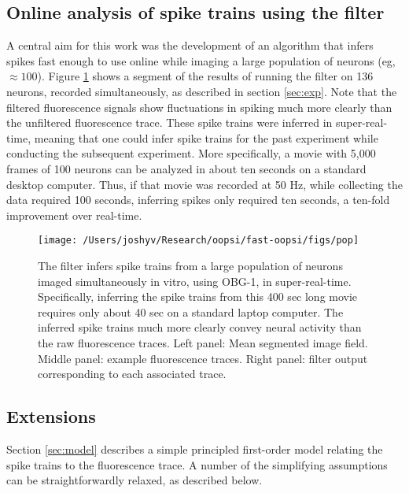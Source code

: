 \subsection{Online analysis of spike trains using the \foopsi filter}

A central aim for this work was the development of an algorithm that infers spikes fast enough to use online while imaging a large population of neurons (eg, $\approx 100$).  Figure \ref{fig:pop} shows a segment of the results of running the \foopsi filter on 136 neurons, recorded simultaneously, as described in section \ref{sec:exp}.  Note that the filtered fluorescence signals show fluctuations in spiking much more clearly than the unfiltered fluorescence trace. These spike trains were inferred in super-real-time, meaning that one could infer spike trains for the past experiment while conducting the subsequent experiment. More specifically, a movie with 5,000 frames of 100 neurons can be analyzed in about ten seconds on a standard desktop computer.  Thus, if that movie was recorded at 50 Hz, while collecting the data required 100 seconds, inferring spikes only required ten seconds, a ten-fold improvement over real-time.  


\begin{figure}[h!]
\begin{centering} 
\texttt{[image: /Users/joshyv/Research/oopsi/fast-oopsi/figs/pop]}
\end{centering}
\caption[\foopsi filter is robust and works online for populations of neurons]{The \foopsi filter infers spike trains from a large population of neurons imaged simultaneously in vitro, using OBG-1, in super-real-time.  Specifically, inferring the spike trains from this 400 sec long movie requires only about 40 sec on a standard laptop computer. The inferred spike trains much more clearly convey neural activity than the raw fluorescence traces.  Left panel: Mean segmented image field.  Middle panel: example fluorescence traces.  Right panel: \foopsi filter output corresponding to each associated trace.} \label{fig:pop}
\end{figure}


\subsection{Extensions}

Section \ref{sec:model} describes a simple principled first-order model relating the spike trains to the fluorescence trace. A number of the simplifying assumptions can be straightforwardly relaxed, as described below.


